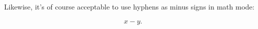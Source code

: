 \documentclass{article}
\begin{document}

Likewise, it's of course acceptable to use hyphens as minus signs in math mode: 

\begin{align*}
x - y.
\end{align*}
\end{document}
